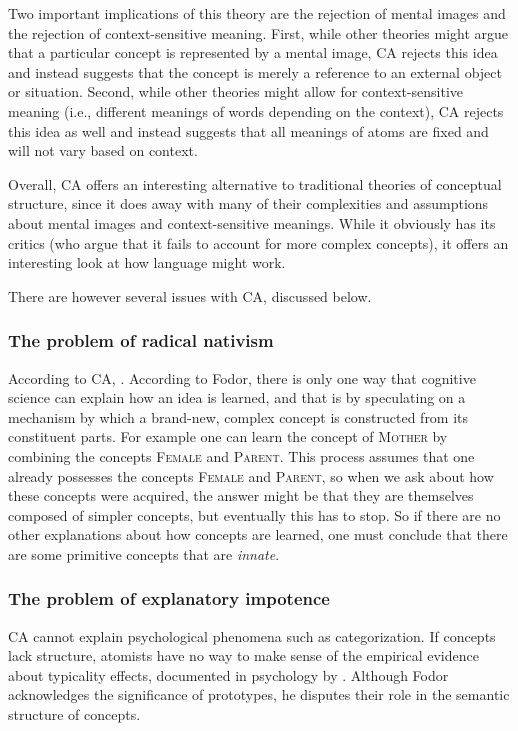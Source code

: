 Two important implications of this theory are the rejection of mental images and the rejection of context-sensitive meaning. First, while other theories might argue that a particular concept is represented by a mental image, CA rejects this idea and instead suggests that the concept is merely a reference to an external object or situation. Second, while other theories might allow for context-sensitive meaning (i.e., different meanings of words depending on the context), CA rejects this idea as well and instead suggests that all meanings of atoms are fixed and will not vary based on context. 

Overall, CA offers an interesting alternative to traditional theories of conceptual structure, since it does away with many of their complexities and assumptions about mental images and context-sensitive meanings. While it obviously has its critics (who argue that it fails to account for more complex concepts), it offers an interesting look at how language might work.

There are however several issues with CA, discussed below.

\subsubsection*{The problem of radical nativism}
According to CA, . According to Fodor, there is only one way that cognitive science can explain how an idea is learned, and that is by speculating on a mechanism by which a brand-new, complex concept is constructed from its constituent parts. For example one can learn the concept of \textsc{Mother} by combining the concepts \textsc{Female} and \textsc{Parent}. This process assumes that one already possesses the concepts \textsc{Female} and \textsc{Parent}, so when we ask about how these concepts were acquired, the answer might be that they are themselves composed of simpler concepts, but eventually this has to stop. So if there are no other explanations about how concepts are learned, one must conclude that there are some primitive concepts that are \emph{innate}. 

\subsubsection*{The problem of explanatory impotence}
CA cannot explain psychological phenomena such as categorization. If concepts lack structure, atomists have no way to make sense of the empirical evidence about typicality effects, documented in psychology by \citep{Rosch1975,Rosch1978}. Although Fodor acknowledges the significance of prototypes, he disputes their role in the semantic structure of concepts.

